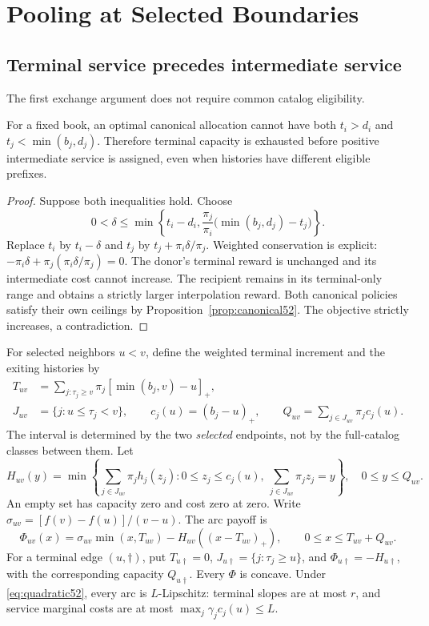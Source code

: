 \section{Pooling at Selected Boundaries}\label{sec:boundaries52}
\subsection{Terminal service precedes intermediate service}
The first exchange argument does not require common catalog eligibility.
\begin{lemma}\label{lem:terminal52}
For a fixed book, an optimal canonical allocation cannot have both $t_i>d_i$ and $t_j<\min(b_j,d_j)$. Therefore terminal capacity is exhausted before positive intermediate service is assigned, even when histories have different eligible prefixes.
\end{lemma}
\begin{proof}
Suppose both inequalities hold. Choose
\[
0<\delta\leq\min\left\{t_i-d_i,\frac{\pi_j}{\pi_i}\bigl(\min(b_j,d_j)-t_j\bigr)\right\}.
\]
Replace $t_i$ by $t_i-\delta$ and $t_j$ by $t_j+\pi_i\delta/\pi_j$. Weighted conservation is explicit:
$-\pi_i\delta+\pi_j(\pi_i\delta/\pi_j)=0$.
The donor's terminal reward is unchanged and its intermediate cost cannot increase. The recipient remains in its terminal-only range and obtains a strictly larger interpolation reward. Both canonical policies satisfy their own ceilings by Proposition~\ref{prop:canonical52}. The objective strictly increases, a contradiction.
\end{proof}

For selected neighbors $u<v$, define the weighted terminal increment and the exiting histories by
\begin{align}
 T_{uv}&=\sum_{j:\tau_j\geq v}\pi_j[\min(b_j,v)-u]_+,\label{eq:terminalarc52}\\
 J_{uv}&=\{j:u\leq\tau_j<v\},\qquad c_j(u)=(b_j-u)_+,\qquad Q_{uv}=\sum_{j\in J_{uv}}\pi_jc_j(u).\label{eq:exit52}
\end{align}
The interval is determined by the two \emph{selected} endpoints, not by the full-catalog classes between them. Let
\begin{equation}\label{eq:servicearc52}
 H_{uv}(y)=\min\left\{\sum_{j\in J_{uv}}\pi_jh_j(z_j):0\leq z_j\leq c_j(u),\ \sum_{j\in J_{uv}}\pi_jz_j=y\right\},\quad 0\leq y\leq Q_{uv}.
\end{equation}
An empty set has capacity zero and cost zero at zero. Write $\sigma_{uv}=[f(v)-f(u)]/(v-u)$. The arc payoff is
\begin{equation}\label{eq:arc52}
 \Phi_{uv}(x)=\sigma_{uv}\min(x,T_{uv})-H_{uv}((x-T_{uv})_+),\qquad 0\leq x\leq T_{uv}+Q_{uv}.
\end{equation}
For a terminal edge $(u,\dagger)$, put $T_{u\dagger}=0$, $J_{u\dagger}=\{j:\tau_j\geq u\}$, and $\Phi_{u\dagger}=-H_{u\dagger}$, with the corresponding capacity $Q_{u\dagger}$. Every $\Phi$ is concave. Under \eqref{eq:quadratic52}, every arc is $L$-Lipschitz: terminal slopes are at most $r$, and service marginal costs are at most $\max_j\gamma_jc_j(u)\leq L$.

